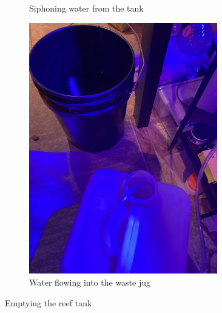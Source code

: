 \documentclass{report}
\begin{document}
\begin{enumerate}
\begin{figure}[H]
\begin{subfigure}{0.5\textwidth}
            \caption{Siphoning water from the tank}
        \end{subfigure}%
        \begin{subfigure}{0.5\textwidth}
            \centering
            \includegraphics[width=0.9\textwidth, angle=-90]{WasteJug.jpg}
            \caption{Water flowing into the waste jug}
        \end{subfigure}
        \caption{Emptying the reef tank}
    \end{figure}
    

\end{enumerate}
\end{document}
